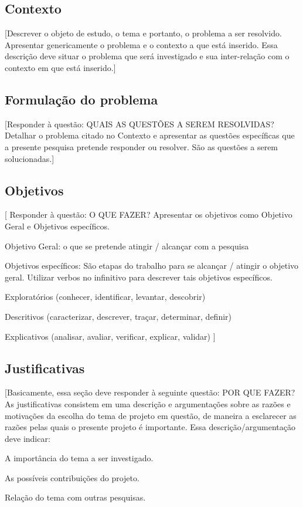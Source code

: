 \subsection{Contexto}

	[Descrever o objeto de estudo, o tema e portanto, o problema a ser resolvido. Apresentar genericamente o problema e o contexto a que está inserido. Essa descrição deve situar o problema que será investigado e sua inter-relação com o contexto em que está inserido.]

\subsection{Formulação do problema}

	[Responder à questão: QUAIS AS QUESTÕES A SEREM RESOLVIDAS?
Detalhar o problema citado no Contexto e apresentar as questões específicas que a presente pesquisa pretende responder ou resolver. São as questões a serem solucionadas.]

\subsection{Objetivos}

	[ Responder à questão: O QUE FAZER?
Apresentar os objetivos como Objetivo Geral e Objetivos específicos.

Objetivo Geral: o que se pretende atingir / alcançar com a pesquisa

Objetivos específicos: São etapas do trabalho para se alcançar / atingir o objetivo geral. Utilizar verbos no infinitivo para descrever tais objetivos específicos.

Exploratórios (conhecer, identificar, levantar, descobrir)

Descritivos (caracterizar, descrever, traçar, determinar, definir)

Explicativos (analisar, avaliar, verificar, explicar, validar)   ]

\subsection{Justificativas}

	[Basicamente, essa seção deve responder à seguinte questão: POR QUE FAZER?
As justificativas consistem em uma descrição e argumentações sobre as razões e motivações da escolha do tema de projeto em questão, de maneira a esclarecer as razões pelas quais o presente projeto é importante.
Essa descrição/argumentação deve indicar:

A importância do tema a ser investigado.

As possíveis contribuições do projeto.

Relação do tema com outras pesquisas.